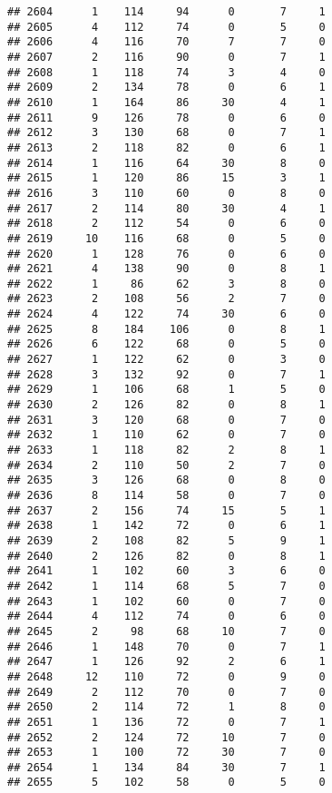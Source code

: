 \documentclass[
]{article}
\begin{document}
\begin{verbatim}
## 2604      1    114     94      0       7     1
## 2605      4    112     74      0       5     0
## 2606      4    116     70      7       7     0
## 2607      2    116     90      0       7     1
## 2608      1    118     74      3       4     0
## 2609      2    134     78      0       6     1
## 2610      1    164     86     30       4     1
## 2611      9    126     78      0       6     0
## 2612      3    130     68      0       7     1
## 2613      2    118     82      0       6     1
## 2614      1    116     64     30       8     0
## 2615      1    120     86     15       3     1
## 2616      3    110     60      0       8     0
## 2617      2    114     80     30       4     1
## 2618      2    112     54      0       6     0
## 2619     10    116     68      0       5     0
## 2620      1    128     76      0       6     0
## 2621      4    138     90      0       8     1
## 2622      1     86     62      3       8     0
## 2623      2    108     56      2       7     0
## 2624      4    122     74     30       6     0
## 2625      8    184    106      0       8     1
## 2626      6    122     68      0       5     0
## 2627      1    122     62      0       3     0
## 2628      3    132     92      0       7     1
## 2629      1    106     68      1       5     0
## 2630      2    126     82      0       8     1
## 2631      3    120     68      0       7     0
## 2632      1    110     62      0       7     0
## 2633      1    118     82      2       8     1
## 2634      2    110     50      2       7     0
## 2635      3    126     68      0       8     0
## 2636      8    114     58      0       7     0
## 2637      2    156     74     15       5     1
## 2638      1    142     72      0       6     1
## 2639      2    108     82      5       9     1
## 2640      2    126     82      0       8     1
## 2641      1    102     60      3       6     0
## 2642      1    114     68      5       7     0
## 2643      1    102     60      0       7     0
## 2644      4    112     74      0       6     0
## 2645      2     98     68     10       7     0
## 2646      1    148     70      0       7     1
## 2647      1    126     92      2       6     1
## 2648     12    110     72      0       9     0
## 2649      2    112     70      0       7     0
## 2650      2    114     72      1       8     0
## 2651      1    136     72      0       7     1
## 2652      2    124     72     10       7     0
## 2653      1    100     72     30       7     0
## 2654      1    134     84     30       7     1
## 2655      5    102     58      0       5     0

\end{verbatim}
\end{document}
